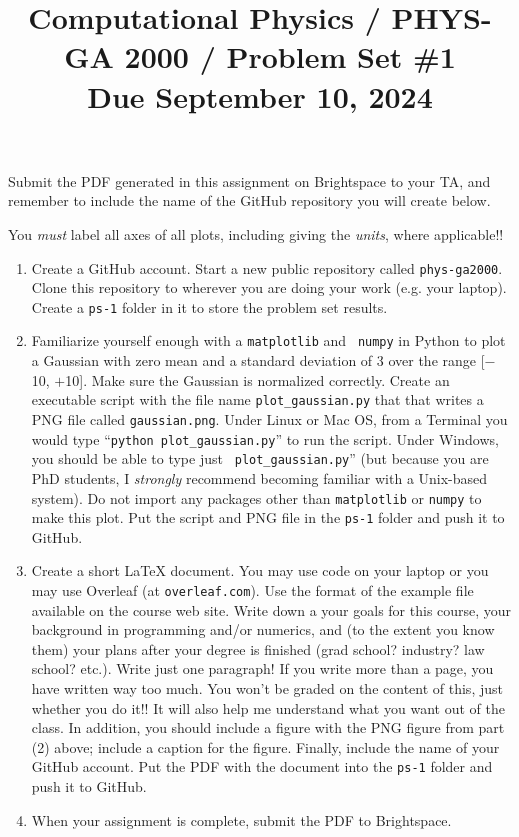 \documentclass[11pt, preprint]{aastex}
\begin{document}
\title{\bf Computational Physics / PHYS-GA 2000 / Problem Set \#1
\\ Due September 10, 2024 }

Submit the PDF generated in this assignment on Brightspace to your TA,
and remember to include the name of the GitHub repository you will
create below.

You {\it must} label all axes of all plots, including giving the {\it
  units}, where applicable!!

\begin{enumerate}

  \item Create a GitHub account. Start a new public repository called
    {\tt phys-ga2000}. Clone this repository to wherever you are doing
    your work (e.g. your laptop). Create a {\tt ps-1} folder in it to
    store the problem set results.

  \item Familiarize yourself enough with a {\tt matplotlib} and {\tt
    numpy} in Python to plot a Gaussian with zero mean and a standard
    deviation of 3 over the range [$-$10, $+$10]. Make sure the
    Gaussian is normalized correctly. Create an executable script with
    the file name {\tt plot\_gaussian.py} that that writes a PNG file
    called {\tt gaussian.png}. Under Linux or Mac OS, from a Terminal
    you would type ``{\tt python plot\_gaussian.py}'' to run the
    script. Under Windows, you should be able to type just {\tt
      plot\_gaussian.py}'' (but because you are PhD students, I {\it
      strongly} recommend becoming familiar with a Unix-based
    system). Do not import any packages other than {\tt matplotlib} or
    {\tt numpy} to make this plot. Put the script and PNG file in the
    {\tt ps-1} folder and push it to GitHub.

  \item Create a short LaTeX document. You may use code on your laptop
    or you may use Overleaf (at {\tt overleaf.com}). Use the format of
    the example file available on the course web site. Write down a
    your goals for this course, your background in programming and/or
    numerics, and (to the extent you know them) your plans after your
    degree is finished (grad school? industry?  law school?
    etc.). Write just one paragraph! If you write more than a page,
    you have written way too much. You won't be graded on the content
    of this, just whether you do it!! It will also help me understand
    what you want out of the class. In addition, you should include a
    figure with the PNG figure from part (2) above; include a caption
    for the figure. Finally, include the name of your GitHub
    account. Put the PDF with the document into the {\tt ps-1} folder
    and push it to GitHub.

  \item When your assignment is complete, submit the PDF to
    Brightspace.

\end{enumerate}
\end{document}
